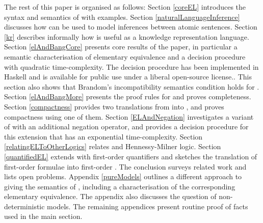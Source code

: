 \NI The rest of this paper is organised as follows: Section
\ref{coreEL} introduces the syntax and semantics of \cathoristic{} with
examples. Section \ref{naturalLanguageInference} discusses how
\cathoristic{} can be used to model inferences between atomic sentences.  Section \ref{kr} describes
informally how \cathoristic{} is useful as a knowledge representation
language.  Section \ref{elAndBangCore} presents core results of the
paper, in particular a semantic characterisation of elementary
equivalence and a decision procedure with quadratic time-complexity. The
decision procedure has been implemented in Haskell and is available
for public use \cite{HaskellImplementation} under a liberal
open-source license..  This
section also shows that Brandom's incompatibility semantics condition
holds for \cathoristic{}.  Section \ref{elAndBangMore} presents the
proof rules for \cathoristic{} and proves completeness. Section
\ref{compactness} provides two translations from \cathoristic{} into
\fol{}, and proves compactness using one of them.  Section
\ref{ELAndNegation} investigates a variant of \cathoristic{} with an additional negation operator,
and provides a decision procedure for this extension that has an
exponential time-complexity.  Section \ref{relatingELToOtherLogics}
relates \cathoristic{} and Hennessy-Milner logic.  Section
\ref{quantifiedEL} extends \cathoristic{} with first-order quantifiers
and sketches the translation of first-order formulae into first-order
\cathoristic{}. The conclusion surveys related work and lists open
problems.  Appendix \ref{pureModels} outlines a different approach to
giving the semantics of \cathoristic{}, including a characterisation of
the corresponding elementary equivalence. The appendix also discusses
the question of non-deterministic models. The remaining appendices
present routine proof of facts used in the main section.
